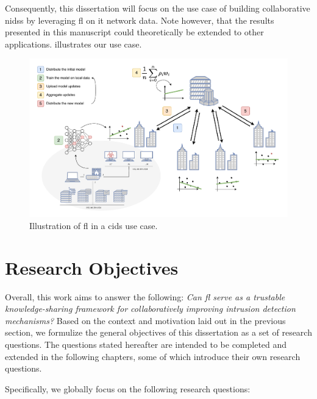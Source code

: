 Consequently, this dissertation will focus on the use case of building collaborative \glspl{nids} by leveraging \gls{fl} on \gls{it} network data.
Note however, that the results presented in this manuscript could theoretically be extended to other applications.
 illustrates our use case.

\begin{figure}
  \centering
  \includegraphics[width=\textwidth]{./figures/fids.drawio.pdf}
  \caption{Illustration of \gls{fl} in a \gls{cids} use case.}
  \label{fig:intro.usecase}
\end{figure}

\section{Research Objectives\label{sec:intro.questions}}

Overall, this work aims to answer the following: \emph{Can \gls{fl} serve as a trustable knowledge-sharing framework for collaboratively improving intrusion detection mechanisms?}
Based on the context and motivation laid out in the previous section, we formulize the general objectives of this dissertation as a set of research questions.
The questions stated hereafter are intended to be completed and extended in the following chapters, some of which introduce their own research questions.

Specifically, we globally focus on the following research questions:

